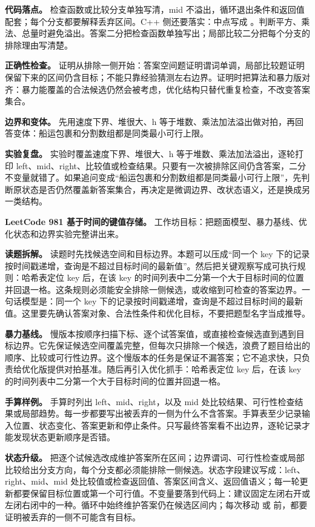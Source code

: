 \textbf{代码落点。} 检查函数或比较分支单独写清，mid 不溢出，循环退出条件和返回值配套；每个分支都要解释丢弃区间。C++ 侧还要落实：中点写成 。判断平方、乘法、总量时避免溢出。答案二分把检查函数单独写出；局部比较二分把每个分支的排除理由写清楚。

\textbf{正确性检查。} 证明从排除一侧开始：答案空间题证明谓词单调，局部比较题证明保留下来的区间仍含目标；不能只靠经验猜测左右边界。证明时把算法和暴力版对齐：暴力能覆盖的合法候选仍然会被考虑，优化结构只替代重复检查，不改变答案集合。

\textbf{边界和变体。} 先用速度下界、堆很大、h 等于堆数、乘法加法溢出做对拍，再回答变体：船运包裹和分割数组都是同类最小可行上限。

\textbf{实验复盘。} 实验时覆盖速度下界、堆很大、h 等于堆数、乘法加法溢出，逐轮打印 left、mid、right、比较值或检查结果。只要有一次被排除区间仍含答案，二分不变量就错了。如果追问变成“船运包裹和分割数组都是同类最小可行上限”，先判断原状态是否仍然覆盖新答案集合，再决定是微调边界、改状态语义，还是换成另一类结构。

\noindent\textbf{LeetCode 981 基于时间的键值存储。} 工作坊目标：把题面模型、暴力基线、优化状态和边界实验完整讲出来。

\textbf{读题拆解。} 读题时先找候选空间和目标边界。本题可以压成“同一个 key 下的记录按时间戳递增，查询是不超过目标时间的最新值”。然后把关键观察写成可执行规则：哈希表定位 key 后，在该 key 的时间列表中二分第一个大于目标时间的位置并回退一格。这条规则必须能安全排除一侧候选，或收缩到可检查的答案边界。一句话模型是：同一个 key 下的记录按时间戳递增，查询是不超过目标时间的最新值。这里要先确认答案对象、合法性条件和优化目标，不要把题型名字当成推导。

\textbf{暴力基线。} 慢版本按顺序扫描下标、逐个试答案值，或直接检查候选直到遇到目标边界。它先保证候选空间覆盖完整，但每次只排除一个候选，浪费了题目给出的顺序、比较或可行性边界。这个慢版本的任务是保证不漏答案；它不追求快，只负责给优化版提供对拍基准。随后再引入优化抓手：哈希表定位 key 后，在该 key 的时间列表中二分第一个大于目标时间的位置并回退一格。

\textbf{手算样例。} 手算时列出 left、mid、right，以及 mid 处比较结果、可行性检查结果或局部趋势。每一步都要写出被丢弃的一侧为什么不含答案。手算表至少记录输入位置、状态变化、答案更新和停止条件。只写最终答案看不出边界，逐轮记录才能发现状态更新顺序是否错。

\textbf{状态升级。} 把逐个试候选改成维护答案所在区间；边界谓词、可行性检查或局部比较给出分支方向，每个分支都必须能排除一侧候选。状态字段建议写成：left、right、mid、mid 处比较值或检查返回值、答案区间含义、返回值语义；每一轮更新都要保留目标位置或第一个可行值。不变量要落到代码上：建议固定左闭右开或左闭右闭中的一种。循环中始终维护答案仍在候选区间内；每次移动  或  前，都要证明被丢弃的一侧不可能含有目标。

